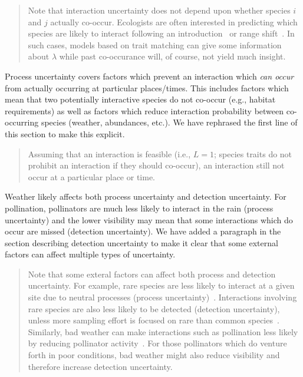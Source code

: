 \documentclass[12pt]{letter}
\begin{document}
	\begin{quotation}

		Note that interaction uncertainty does not depend upon whether species $i$ and $j$ actually co-occur. Ecologists are often interested in predicting which species are likely to interact following an introduction~\citep{} or range shift~\citep{}. In such cases, models based on trait matching can give some information about $\lambda$ while past co-occurance will, of course, not yield much insight.

	\end{quotation}

Process uncertainty covers factors which prevent an interaction which \emph{can occur} from actually occurring at particular places/times. This includes factors which mean that two potentially interactive species do not co-occur (e.g., habitat requirements) as well as factors which reduce interaction probability between co-occurring species (weather, abundances, etc.). We have rephrased the first line of this section to make this explicit.

	\begin{quotation}
		
		Assuming that an interaction is feasible (i.e., $L=1$; species traits do not prohibit an interaction if they should co-occur), an interaction still not occur at a particular place or time. 

	\end{quotation}

Weather likely affects both process uncertainty and detection uncertainty. For pollination, pollinators are much less likely to interact in the rain (process uncertainty) and the lower visibility may mean that some interactions which do occur are missed (detection uncertainty). We have added a paragraph in the section describing detection uncertainty to make it clear that some external factors can affect multiple types of uncertainty. 

	\begin{quotation}

		Note that some exteral factors can affect both process and detection uncertainty. For example, rare species are less likely to interact at a given site due to neutral processes (process uncertainty)~\citep{}. Interactions involving rare species are also less likely to be detected (detection uncertainty), unless more sampling effort is focused on rare than common species~\citep{}. Similarly, bad weather can make interactions such as pollination less likely by reducing pollinator activity~\citep{}. For those pollinators which do venture forth in poor conditions, bad weather might also reduce visibility and therefore increase detection uncertainty.	

	\end{quotation}
\end{document}
